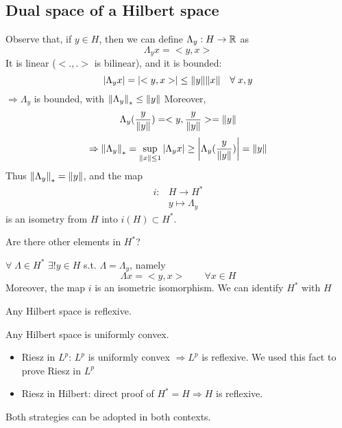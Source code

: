 \subsection*{Dual space of a Hilbert space}
Observe that, if \(y \in H\), then we can define \(\Lambda_y : H \to \mathbb{R}\) as
\[
    \Lambda_y x = <y, x>
\]
It is linear (\(<.,.> \) is bilinear), and it is bounded: 
\[
    \abs{\Lambda_y x}= \abs{<y, x>} \leq \norm{y} \norm{x} \quad \forall\; x, y
\]
\(\Rightarrow \Lambda_y\) is bounded, with \(\norm{\Lambda_y}_* \leq \norm{y}\)
Moreover, 
\[
    \Lambda_y (\frac{y}{\norm{y}}) = <y, \frac{y}{\norm{y}}> = \norm{y}
\]
\[
    \Rightarrow \norm{\Lambda_y}_* = \sup_{\norm{x} \leq 1} \abs{\Lambda_y x} \geq \abs{\Lambda_y (\frac{y}{\norm{y}})} = \norm{y}
\]
Thus \( \norm{\Lambda_y}_* = \norm{y}\), and the map 
\[
    \begin{array}{rl}
        i: & H \to H^* \\
        & y \mapsto \Lambda_y    
    \end{array}
\]
is an isometry from \(H\) into \(i(H) \subset {H^*}\).

Are there other elements in \(H^*\)?

\begin{theorem}
    \(\forall \; \Lambda \in H^* \) \(\exists! y \in H\) s.t. \(\Lambda = \Lambda_y\), namely
    \[
        \Lambda x = <y, x> \qquad \forall x \in H
    \]
    Moreover, the map \(i\) is an isometric isomorphism. We can identify \(H^*\) with \(H\)
\end{theorem}
\begin{corollary}
    Any Hilbert space is reflexive. 
\end{corollary}
\begin{remark}
    Any Hilbert space is uniformly convex.
\end{remark}

\begin{itemize}
    \item Riesz in \(L^p\): \(L^p \) is uniformly convex \(\Rightarrow L^p\) is reflexive. We used this fact to prove Riesz in \(L^p\)
    \item Riesz in Hilbert: direct proof of \(H^* = H \Rightarrow H\) is reflexive.
\end{itemize}
Both strategies can be adopted in both contexts.